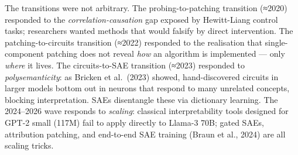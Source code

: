 The transitions were not arbitrary. The probing-to-patching transition (≈2020) responded to the \emph{correlation-causation} gap exposed by Hewitt-Liang control tasks; researchers wanted methods that would falsify by direct intervention. The patching-to-circuits transition (≈2022) responded to the realisation that single-component patching does not reveal \emph{how} an algorithm is implemented --- only \emph{where} it lives. The circuits-to-SAE transition (≈2023) responded to \emph{polysemanticity}: as Bricken et al.~(2023) showed, hand-discovered circuits in larger models bottom out in neurons that respond to many unrelated concepts, blocking interpretation. SAEs disentangle these via dictionary learning. The 2024--2026 wave responds to \emph{scaling}: classical interpretability tools designed for GPT-2 small (117M) fail to apply directly to Llama-3 70B; gated SAEs, attribution patching, and end-to-end SAE training (Braun et al., 2024) are all scaling tricks.

